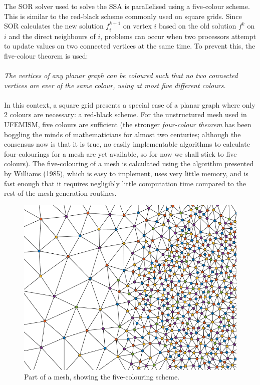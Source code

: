 \documentclass{article}
\begin{document}
The SOR solver used to solve the SSA is parallelised using a five-colour scheme. This is similar to the red-black scheme commonly used on square grids. Since SOR calculates the new solution $f_i^{k+1}$ on vertex $i$ based on the old solution $f^k$ on $i$ and the direct neighbours of $i$, problems can occur when two processors attempt to update values on two connected vertices at the same time. To prevent this, the five-colour theorem is used:\\
\\
\emph{The vertices of any planar graph can be coloured such that no two connected vertices are ever of the same colour, using at most five different colours.}\\
\\
In this context, a square grid presents a special case of a planar graph where only 2 colours are necessary: a red-black scheme. For the unstructured mesh used in UFEMISM, five colours are sufficient (the stronger \textit{four-colour theorem} has been boggling the minds of mathematicians for almost two centuries; although the consensus now is that it is true, no easily implementable algorithms to calculate four-colourings for a mesh are yet available, so for now we shall stick to five colours). The five-colouring of a mesh is calculated using the algorithm presented by Williams (1985), which is easy to implement, uses very little memory, and is fast enough that it requires negligibly little computation time compared to the rest of the mesh generation routines.

\begin{figure}[h!] \label{fig:fivecolours}
  \includegraphics[width=0.8\linewidth]{Fig_fivecolours.png}
  \caption{Part of a mesh, showing the five-colouring scheme.}
\end{figure}
\end{document}
